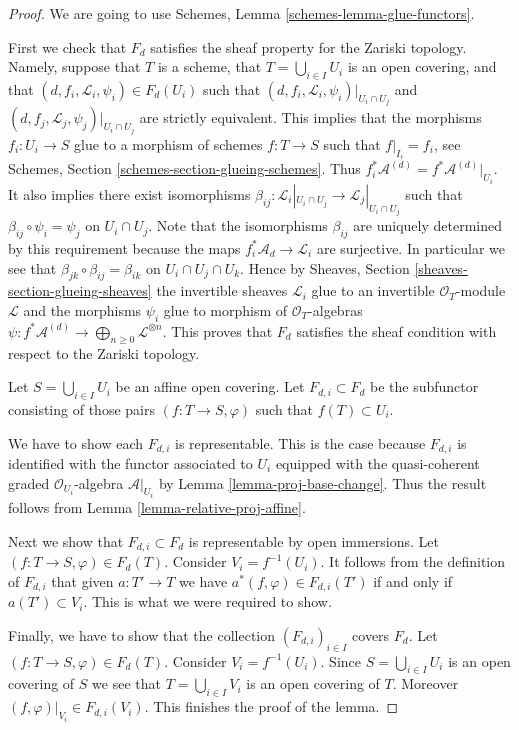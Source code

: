 \documentclass{stacks-project}
\theoremstyle{plain}
\theoremstyle{definition}
\theoremstyle{remark}
\numberwithin{equation}{subsection}
\begin{document}
\begin{proof}
We are going to use Schemes, Lemma \ref{schemes-lemma-glue-functors}.

\medskip\noindent
First we check that $F_d$ satisfies the sheaf property for the
Zariski topology. Namely, suppose that $T$ is a scheme,
that $T = \bigcup_{i \in I} U_i$ is an open covering,
and that $(d, f_i, \mathcal{L}_i, \psi_i) \in F_d(U_i)$ such that
$(d, f_i, \mathcal{L}_i, \psi_i)|_{U_i \cap U_j}$ and
$(d, f_j, \mathcal{L}_j, \psi_j)|_{U_i \cap U_j}$ are strictly
equivalent. This implies that the morphisms $f_i : U_i \to S$
glue to a morphism of schemes $f : T \to S$ such that
$f|_{I_i} = f_i$, see Schemes, Section \ref{schemes-section-glueing-schemes}.
Thus $f_i^*\mathcal{A}^{(d)} = f^*\mathcal{A}^{(d)}|_{U_i}$.
It also implies there exist isomorphisms
$\beta_{ij} : \mathcal{L}_i|_{U_i \cap U_j} \to \mathcal{L}_j|_{U_i \cap U_j}$
such that $\beta_{ij} \circ \psi_i = \psi_j$ on $U_i \cap U_j$.
Note that the isomorphisms $\beta_{ij}$ are uniquely determined
by this requirement because the maps $f_i^*\mathcal{A}_d \to \mathcal{L}_i$
are surjective. In particular we see that
$\beta_{jk} \circ \beta_{ij} = \beta_{ik}$ on $U_i \cap U_j \cap U_k$.
Hence by Sheaves,
Section \ref{sheaves-section-glueing-sheaves} the invertible sheaves
$\mathcal{L}_i$ glue to an invertible $\mathcal{O}_T$-module
$\mathcal{L}$ and the morphisms $\psi_i$ glue to
morphism of $\mathcal{O}_T$-algebras
$\psi : f^*\mathcal{A}^{(d)} \to \bigoplus_{n \geq 0} \mathcal{L}^{\otimes n}$.
This proves that $F_d$ satisfies the sheaf condition with respect to
the Zariski topology.

\medskip\noindent
Let $S = \bigcup_{i \in I} U_i$ be an affine open covering.
Let $F_{d, i} \subset F_d$ be the subfunctor consisting of
those pairs $(f : T \to S, \varphi)$ such that
$f(T) \subset U_i$.

\medskip\noindent
We have to show each $F_{d, i}$ is representable.
This is the case because $F_{d, i}$ is identified with
the functor associated to $U_i$ equipped with
the quasi-coherent graded $\mathcal{O}_{U_i}$-algebra
$\mathcal{A}|_{U_i}$ by Lemma \ref{lemma-proj-base-change}.
Thus the result follows from Lemma \ref{lemma-relative-proj-affine}.

\medskip\noindent
Next we show that $F_{d, i} \subset F_d$ is representable by open immersions.
Let $(f : T \to S, \varphi) \in F_d(T)$. Consider $V_i = f^{-1}(U_i)$.
It follows from the definition of $F_{d, i}$ that given $a : T' \to T$
we have $a^*(f, \varphi) \in F_{d, i}(T')$ if and only if $a(T') \subset V_i$.
This is what we were required to show.

\medskip\noindent
Finally, we have to show that the collection $(F_{d, i})_{i \in I}$
covers $F_d$. Let $(f : T \to S, \varphi) \in F_d(T)$.
Consider $V_i = f^{-1}(U_i)$. Since $S = \bigcup_{i \in I} U_i$
is an open covering of $S$ we see that $T = \bigcup_{i \in I} V_i$
is an open covering of $T$. Moreover $(f, \varphi)|_{V_i} \in F_{d, i}(V_i)$.
This finishes the proof of the lemma.
\end{proof}
\end{document}
